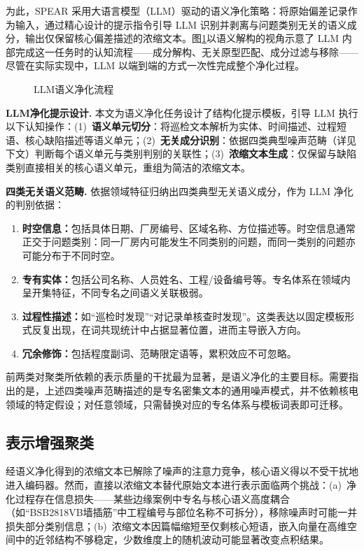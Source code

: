 \documentclass[10.5pt,compsoc,UTF8]{CjC}
\theoremstyle{mystyle}
\begin{document}
为此，SPEAR 采用大语言模型（LLM）驱动的语义净化策略：将原始偏差记录作为输入，通过精心设计的提示指令引导 LLM 识别并剥离与问题类别无关的语义成分，输出仅保留核心偏差描述的浓缩文本。图\ref{fig:purification}以语义解构的视角示意了 LLM 内部完成这一任务时的认知流程——成分解构、无关原型匹配、成分过滤与移除——尽管在实际实现中，LLM 以端到端的方式一次性完成整个净化过程。

\begin{figure}[htbp]
  \centering
  \resizebox{\linewidth}{!}{}
  \caption{LLM语义净化流程}
  \label{fig:purification}
\end{figure}

\textbf{LLM净化提示设计.} 本文为语义净化任务设计了结构化提示模板，引导 LLM 执行以下认知操作：(1)~\textbf{语义单元切分}：将巡检文本解析为实体、时间描述、过程短语、核心缺陷描述等语义单元；(2)~\textbf{无关成分识别}：依据四类典型噪声范畴（详见下文）判断每个语义单元与类别判别的关联性；(3)~\textbf{浓缩文本生成}：仅保留与缺陷类别直接相关的核心语义单元，重组为简洁的浓缩文本。

\textbf{四类无关语义范畴.} 依据领域特征归纳出四类典型无关语义成分，作为 LLM 净化的判别依据：
\begin{enumerate}[leftmargin=1.5em,itemsep=1pt]
  \item \textbf{时空信息：}包括具体日期、厂房编号、区域名称、方位描述等。时空信息通常正交于问题类别：同一厂房内可能发生不同类别的问题，而同一类别的问题亦可能分布于不同时空。
  \item \textbf{专有实体：}包括公司名称、人员姓名、工程/设备编号等。专名体系在领域内呈开集特征，不同专名之间语义关联极弱。
  \item \textbf{过程性描述：}如``巡检时发现''``对记录单核查时发现''。这类表达以固定模板形式反复出现，在词共现统计中占据显著位置，进而主导嵌入方向。
  \item \textbf{冗余修饰：}包括程度副词、范畴限定语等，累积效应不可忽略。
\end{enumerate}
前两类对聚类所依赖的表示质量的干扰最为显著，是语义净化的主要目标。需要指出的是，上述四类噪声范畴描述的是专名密集文本的通用噪声模式，并不依赖核电领域的特定假设；对任意领域，只需替换对应的专名体系与模板词表即可迁移。

{\heiti \subsection{表示增强聚类}}

经语义净化得到的浓缩文本已解除了噪声的注意力竞争，核心语义得以不受干扰地进入编码器。然而，直接以浓缩文本替代原始文本进行表示面临两个挑战：(a)~净化过程存在信息损失——某些边缘案例中专名与核心语义高度耦合（如``BSB2818VB墙插筋''中工程编号与部位名称不可拆分），移除噪声时可能一并损失部分类别信息；(b)~浓缩文本因篇幅缩短至仅剩核心短语，嵌入向量在高维空间中的近邻结构不够稳定，少数维度上的随机波动可能显著改变点积结果。
\end{document}
